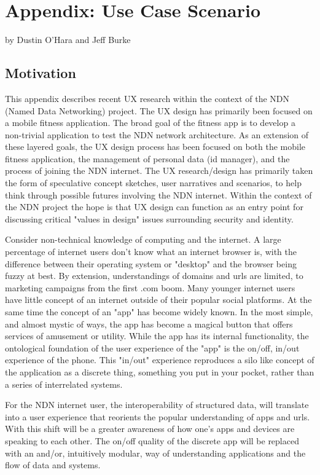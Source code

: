 \section{Appendix: Use Case Scenario}

by Dustin O'Hara and Jeff Burke

\subsection{Motivation}
This appendix describes recent UX research within the context of the NDN (Named Data Networking) project. The UX design has primarily been focused on a mobile fitness application. The broad goal of the fitness app is to develop a non-trivial application to test the NDN network architecture. As an extension of these layered goals, the UX design process has been focused on both the mobile fitness application, the management of personal data (id manager), and the process of joining the NDN internet. The UX research/design has primarily taken the form of speculative concept sketches, user narratives and scenarios, to help think through possible futures involving the NDN internet. Within the context of the NDN project the hope is that UX design can function as an entry point for discussing critical "values in design" issues surrounding security and identity. 

Consider non-technical knowledge of computing and the internet. A large percentage of internet users don't know what an internet browser is, with the difference between their operating system or "desktop" and the browser being fuzzy at best. By extension, understandings of domains and urls are limited, to marketing campaigns from the first .com boom. Many younger internet users have little concept of an internet outside of their popular social platforms. At the same time the concept of an "app" has become widely known. In the most simple, and almost mystic of ways, the app has become a magical button that offers services of amusement or utility. While the app has its internal functionality, the ontological foundation of the user experience of the "app" is the on/off, in/out experience of the phone. This "in/out" experience reproduces a silo like concept of the application as a discrete thing, something you put in your pocket, rather than a series of interrelated systems. 

For the NDN internet user, the interoperability of structured data, will translate into a user experience that reorients the popular understanding of apps and urls. With this shift will be a greater awareness of how one's apps and devices are speaking to each other. The on/off quality of the discrete app will be replaced with an and/or, intuitively modular, way of understanding applications and the flow of data and systems.
  
